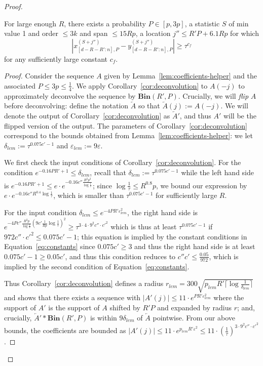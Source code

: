\documentclass[11pt]{article}
\theoremstyle{plain}
\newcommand{\Bin}[2]{\textbf{Bin}(#1,#2)}
\newcommand{\eps}{\varepsilon}
\begin{document}
\begin{proof}
\begin{lemma}\label{lem:statistics-deconvolution}
    For large enough $R$, there exists a probability $P \in [p,3p]$, a statistic $S$ of min value 1 and order $\leq 3k$ and span $\leq 15Rp$, a location $j'' \leq R'P + 6.1Rp$ for which
    \begin{equation}\label{eq:final-discrepancy}|x_{[d-R-R':n],P}^{(S+j'')}-y_{[d-R-R':n],P}^{(S+j'')}|\geq \tau^{c_f}\end{equation}
    for any sufficiently large constant $c_f$. 
\end{lemma}
\begin{proof}
    Consider the sequence $A$ given by Lemma~\ref{lem:coefficients-helper} and the associated $P\leq 3p\leq\frac{1}{4}$. We apply Corollary~\ref{cor:deconvolution} to $A(-j)$ to approximately deconvolve the sequence by $\Bin{R'}{P}$. Crucially, we will \emph{flip} $A$ before deconvolving: define the notation $\overleftarrow{A}$ so that $\overleftarrow{A}(j):=A(-j)$. We will denote the output of Corollary~\ref{cor:deconvolution} as $\overleftarrow{A}'$, and thus $A'$ will be the flipped version of the output. The parameters of Corollary~\ref{cor:deconvolution} correspond to the bounds obtained from Lemma~\ref{lem:coefficients-helper}: we let $\delta_{lem}:=\tau^{0.075c'-1}$ and $\eps_{lem}:=9\eps$. 

    We first check the input conditions of Corollary~\ref{cor:deconvolution}. For the condition $e^{-0.16PR'+1}\leq\delta_{lem}$, recall that $\delta_{lem}:=\tau^{0.075c'-1}$ while the left hand side is $e^{-0.16PR'+1}\leq e\cdot e^{-0.16 c''\frac{R^2 p^2}{\log\frac{1}{\tau}}}$; since $\log\frac{1}{\tau}\leq R^{0.8}p$, we bound our expression by $e\cdot e^{-0.16 c''R^{0.4}\log\frac{1}{\tau}}$, which is smaller than $\tau^{0.075c'-1}$ for sufficiently large $R$.

    For the input condition $\delta_{lem}\leq e^{-4PR'\eps_{lem}^2}$, the right hand side is $e^{-4Pc''\frac{R^2 p}{\log\frac{1}{\tau}}(9c' \frac{1}{Rp}\log\frac{1}{\tau})^2}\geq\tau^{3\cdot 4\cdot 9^2c''\cdot {c'}^2}$ which is thus at least $\tau^{0.075c'-1}$ if $972c''\cdot {c'}^2\leq 0.075c'-1$; this equation is implied by the constant conditions in Equation~\ref{eq:constants} since $0.075c'\geq 3$ and thus the right hand side is at least $0.075c'-1\geq 0.05c'$, and thus this condition reduces to $c''c'\leq \frac{0.05}{972}$, which is implied by the second condition of Equation~\ref{eq:constants}.
    
    Thus Corollary~\ref{cor:deconvolution} defines a radius $r_{lem}=300\sqrt{p_{lem}R'\lceil\log\frac{1}{\delta_{lem}}\rceil}$ and shows that there exists a sequence with $|A'(j)|\leq 11\cdot e^{PR'\eps_{lem}^2}$ where the support of $A'$ is the support of $A$ shifted by $R'P$ and expanded by radius $r$; and, crucially, $\overleftarrow{A}'\ast \Bin{R'}{P}$ is within $9\delta_{lem}$ of $\overleftarrow{A}$ pointwise. From our above bounds, the coefficients are bounded as $|A'(j)|\leq 11\cdot e^{p_{lem}R'\eps^2}\leq 11\cdot (\frac{1}{\tau})^{3\cdot 9^2c''\cdot {c'}^2}$. 


\end{proof}
\end{proof}
\end{document}
